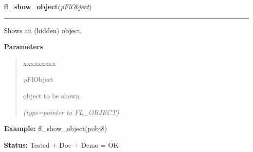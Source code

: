     \label{xformslib:flbasic:fl_show_object}

    \vspace{0.5ex}

\hspace{.8\funcindent}\begin{boxedminipage}{\funcwidth}

    \raggedright \textbf{fl\_show\_object}(\textit{pFlObject})

    \vspace{-1.5ex}

    \rule{\textwidth}{0.5\fboxrule}
\setlength{\parskip}{2ex}
    Shows an (hidden) object.

\setlength{\parskip}{1ex}
      \textbf{Parameters}
      \vspace{-1ex}

      \begin{quote}
        \begin{Ventry}{xxxxxxxxx}

          \item[pFlObject]

          object to be shown

            {\it (type=pointer to FL\_OBJECT)}

        \end{Ventry}

      \end{quote}

\textbf{Example:} fl\_show\_object(pobj8)



\textbf{Status:} Tested + Doc + Demo = OK



    \end{boxedminipage}

    \label{xformslib:flbasic:fl_hide_object}

    \vspace{0.5ex}

